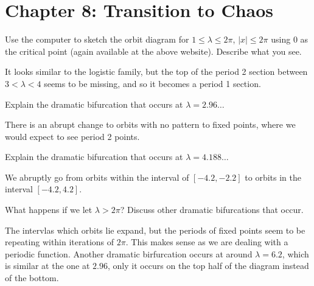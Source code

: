 \documentclass[12pt]{article}
\newenvironment{exercise}[2][Exercise]{\begin{trivlist}
\item[\hskip \labelsep {\bfseries #1} \hskip \labelsep {\bfseries #2.}]}{\end{trivlist}}
\begin{document}
\section*{Chapter 8: Transition to Chaos}
\begin{exercise}{4}
	Use the computer to sketch the orbit diagram for $1 \le \lambda \le 2\pi$, $|x| \le 2\pi$
using 0 as the critical point (again available at the above website). Describe
what you see.
\end{exercise}
It looks similar to the logistic family, but the top of the period 2 section between $3 < \lambda < 4$ seems to be missing, and so it becomes a period 1 section. 
\begin{exercise}{5}
	Explain the dramatic bifurcation that occurs at $\lambda = 2.96 \ldots$
\end{exercise}
	There is an abrupt change to orbits with no pattern to fixed points, where we would expect to see period 2 points. 
\begin{exercise}{6}
	Explain the dramatic bifurcation that occurs at $\lambda = 4.188 \ldots$	
\end{exercise}
We abruptly go from orbits within the interval of $[-4.2,-2.2]$ to orbits in the interval $[-4.2,4.2]$.
\begin{exercise}{8}
	What happens if we let $\lambda > 2\pi$? Discuss other dramatic bifurcations that
occur.
\end{exercise}
The intervlas which orbits lie expand, but the periods of fixed points seem to be repeating within iterations of $2\pi$. This makes sense as we are dealing with a periodic function. Another dramatic birfurcation occurs at around $\lambda = 6.2$, which is similar at the one at $2.96$, only it occurs on the top half of the diagram instead of the bottom.
\end{document}
